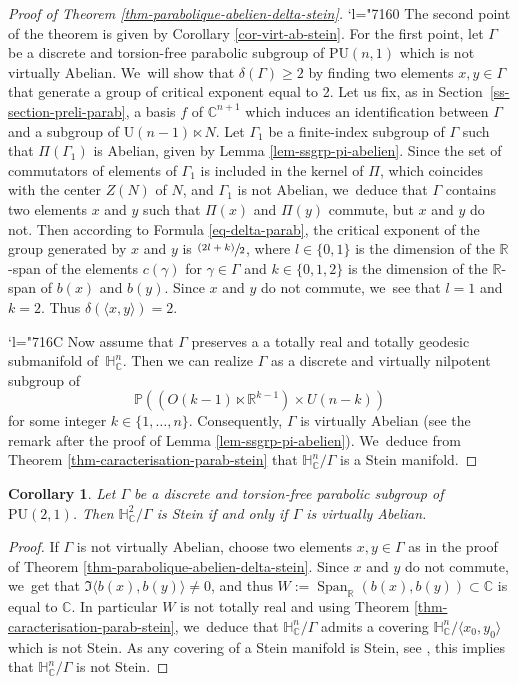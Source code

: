 \documentclass[11pt]{article}
\newcommand{\Changel}{\mathcode`l="7160}
\newcommand{\Changelback}{\mathcode`l="716C}
\newcommand{\psfrac}[2]{\sfrac{(#1)}{#2}}
\newtheorem{corollary}[theorem]{Corollary}
\theoremstyle{definition}
\newcommand{\C}{\mathbb{C}}
\newcommand{\R}{\mathbb{R}}
\newcommand{\HNC}{\mathbb{H}^{n}_{\C}}
\newcommand{\PU}{\mathrm{PU}}
\def\C{\mathbb{C}}
\newcommand{\HNC}{\mathbb{H}^{n}_{\C}}
\newcommand{\PU}{\mathrm{PU}}
\begin{document}
\begin{proof}[Proof of Theorem \ref{thm-parabolique-abelien-delta-stein}]\Changel
The second point of the theorem is given by Corollary \ref{cor-virt-ab-stein}. For the first point, let $\Gamma$ be a discrete and torsion-free parabolic subgroup of $\PU(n,1)$ which is not virtually Abelian. We~will show that $\delta(\Gamma)\ge2$ by finding two elements $x,y\in \Gamma$ that generate a group of critical exponent equal to 2. Let us fix, as in Section~\ref{ss-section-preli-parab}, a basis $f$ of $\C^{n+1}$ which induces an identification between $\Gamma$ and a subgroup of $\mathrm{U}(n-1)\ltimes N$. Let $\Gamma_1$ be a finite-index subgroup of $\Gamma$ such that $\Pi(\Gamma_1)$ is Abelian, given by Lemma \ref{lem-ssgrp-pi-abelien}. Since the set of commutators of elements of $\Gamma_1$ is included in the kernel of $\Pi$, which coincides with the center $Z(N)$ of $N$, and $\Gamma_1$ is not Abelian, we~deduce that $\Gamma$ contains two elements $x$ and $y$ such that $\Pi(x)$ and $\Pi(y)$ commute, but $x$ and $y$ do not. Then according to Formula \eqref{eq-delta-parab}, the critical exponent of the group generated by $x$ and $y$ is $\psfrac{2l+k}{2}$, where $l\in\{0,1\}$ is the dimension of the $\R$-span of the elements $c(\gamma)$ for $\gamma\in\Gamma$ and $k\in\{0,1,2\}$ is the dimension of the $\R$-span of $b(x)$ and $b(y)$. Since $x$ and $y$ do not commute, we~see that $l=1$ and $k=2$. Thus $\delta(\langle x,y\rangle)=2$.

\Changelback
Now assume that $\Gamma$ preserves a a totally real and totally geodesic submanifold of~$\HNC$. Then we can realize $\Gamma$ as a discrete and virtually nilpotent subgroup of
\begin{equation*}
\mathbb{P}((O(k-1)\ltimes \R^{k-1})\times U(n-k))
\end{equation*}for some integer $k\in\{1,\dots,n\}$. Consequently, $\Gamma$ is virtually Abelian (see the remark after the proof of Lemma \ref{lem-ssgrp-pi-abelien}). We~deduce from Theorem \ref{thm-caracterisation-parab-stein} that $\HNC/\Gamma$ is a Stein manifold.
\end{proof}

\begin{corollary}\label{cor-parab-dim2}
Let $\Gamma$ be a discrete and torsion-free parabolic subgroup of $\PU(2,1)$. Then $\mathbb{H}^{2}_{\C}/\Gamma$ is Stein if and only if $\Gamma$ is virtually Abelian.
\end{corollary}

\begin{proof}
If $\Gamma$ is not virtually Abelian, choose two elements $x,y\in \Gamma$ as in the proof of Theorem \ref{thm-parabolique-abelien-delta-stein}. Since $x$ and $y$ do not commute, we~get that $\Im\langle b(x),b(y)\rangle \ne 0$, and thus $W:=\operatorname{Span}_{\R}(b(x),b(y))\subset\C$ is equal to $\C$. In particular $W$ is not totally real and using Theorem \ref{thm-caracterisation-parab-stein}, we~deduce that $\HNC/\Gamma$ admits a covering $\HNC/\langle x_0,y_0\rangle$ which is not Stein. As any covering of a Stein manifold is Stein, see \cite{steinUberlagerungenHolomorphvollstandigerKomplexer1956}, this implies that $\HNC/\Gamma$ is not Stein.
\end{proof}
\end{document}
